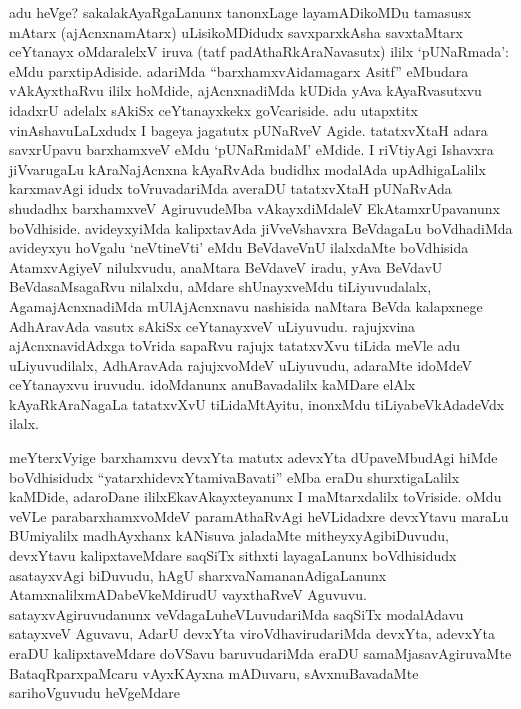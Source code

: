 
\begin{artha}
adu heVge? sakalakAyaRgaLanunx tanonxLage layamADikoMDu tamasusx mAtarx (ajAcnxnamAtarx) uLisikoMDidudx savxparxkAsha savxtaMtarx ceYtanayx oMdaralelxV  iruva (tatf padAthaRkAraNavasutx) ililx `pUNaRmada': eMdu parxtipAdiside. adariMda ``barxhamxvAidamagarx Asitf'' eMbudara vAkAyxthaRvu ililx hoMdide, ajAcnxnadiMda kUDida yAva kAyaRvasutxvu idadxrU adelalx sAkiSx ceYtanayxkekx goVcariside. adu utapxtitx vinAshavuLaLxdudx I bageya jagatutx pUNaRveV Agide. tatatxvXtaH adara savxrUpavu barxhamxveV eMdu `pUNaRmidaM' eMdide. I riVtiyAgi Ishavxra jiVvarugaLu kAraNajAcnxna kAyaRvAda budidhx modalAda upAdhigaLalilx karxmavAgi idudx toVruvadariMda averaDU tatatxvXtaH pUNaRvAda shudadhx barxhamxveV AgiruvudeMba vAkayxdiMdaleV EkAtamxrUpavanunx boVdhiside. avideyxyiMda kalipxtavAda jiVveVshavxra BeVdagaLu boVdhadiMda avideyxyu hoVgalu `neVtineVti' eMdu BeVdaveVnU ilalxdaMte boVdhisida AtamxvAgiyeV nilulxvudu, anaMtara BeVdaveV iradu, yAva BeVdavU BeVdasaMsagaRvu nilalxdu, aMdare shUnayxveMdu tiLiyuvudalalx, AgamajAcnxnadiMda mUlAjAcnxnavu nashisida naMtara BeVda kalapxnege AdhAravAda vasutx sAkiSx ceYtanayxveV uLiyuvudu. rajujxvina ajAcnxnavidAdxga toVrida sapaRvu rajujx tatatxvXvu tiLida meVle adu uLiyuvudilalx, AdhAravAda rajujxvoMdeV uLiyuvudu, adaraMte idoMdeV ceYtanayxvu iruvudu. idoMdanunx anuBavadalilx kaMDare elAlx kAyaRkAraNagaLa tatatxvXvU tiLidaMtAyitu, inonxMdu tiLiyabeVkAdadeVdx ilalx. 
\end{artha}


\begin{artha}
meYterxVyige barxhamxvu devxYta matutx adevxYta dUpaveMbudAgi hiMde boVdhisidudx ``yatarxhidevxYtamivaBavati'' eMba eraDu shurxtigaLalilx kaMDide, adaroDane ililx\break EkavAkayxteyanunx I maMtarxdalilx toVriside. oMdu veVLe parabarxhamxvoMdeV paramAthaRvAgi heVLidadxre devxYtavu maraLu BUmiyalilx madhAyxhanx kANisuva jaladaMte mitheyxyAgibiDuvudu, devxYtavu kalipxtaveMdare saqSiTx sithxti layagaLanunx boVdhisidudx asatayxvAgi biDuvudu, hAgU sharxvaNamananAdigaLanunx Atamxnalilx\break mADabeVkeMdirudU vayxthaRveV Aguvuvu. satayxvAgiruvudanunx veVdagaLu\break heVLuvudariMda saqSiTx modalAdavu satayxveV Aguvavu, AdarU devxYta viroVdhavirudariMda devxYta, adevxYta eraDU kalipxtaveMdare doVSavu baruvudariMda eraDU samaMjasavAgiruvaMte BataqRparxpaMcaru vAyxKAyxna mADuvaru, sAvxnuBavadaMte sarihoVguvudu heVgeMdare\ndash 
\end{artha}

